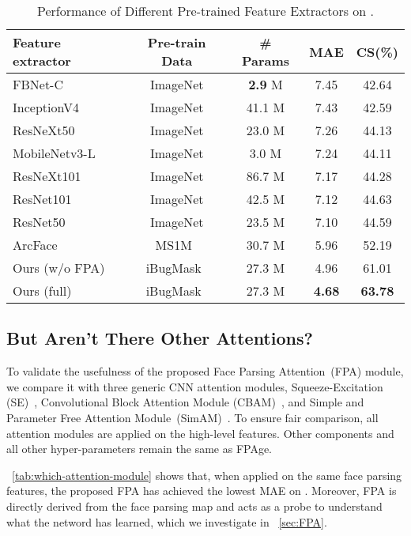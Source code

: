 \begin{table}[h]
    \caption{Performance of Different Pre-trained Feature Extractors on \imdbc.}
    \label{tab:which-feature-extractor}
    \centering
    \begin{tabular}{l|c|c|c|c}
    \toprule
        Feature extractor & Pre-train Data & \# Params & MAE  & CS(\%)  \\ \hline
        FBNet-C & ImageNet  & \textbf{2.9} M & 7.45 & 42.64 \\
        InceptionV4& ImageNet  & 41.1 M & 7.43 & 42.59 \\
        ResNeXt50& ImageNet & 23.0 M & 7.26 & 44.13 \\
        MobileNetv3-L& ImageNet  & 3.0 M & 7.24 & 44.11 \\
        ResNeXt101& ImageNet & 86.7 M & 7.17 & 44.28 \\ 
        ResNet101& ImageNet & 42.5 M & 7.12 & 44.63 \\
        ResNet50& ImageNet & 23.5 M & 7.10 & 44.59 \\
        ArcFace~\cite{deng2018arcface}& MS1M~\cite{guo2016ms1m} & 30.7 M & 5.96 & 52.19 \\ \hline
        Ours (w/o FPA) & iBugMask~\cite{linRoITanhpolarTransformer2021} & 27.3 M & 4.96 & 61.01 \\ 
        Ours (full) & iBugMask~\cite{linRoITanhpolarTransformer2021} & 27.3 M & \textbf{4.68} & \textbf{63.78} \\ 
    \bottomrule
    \end{tabular}
\end{table}






\subsection{But Aren't There Other Attentions?}
To validate the usefulness of the proposed Face Parsing Attention~(FPA) module, we compare it with three generic CNN attention modules, Squeeze-Excitation (SE)~\cite{Hu_2018_CVPR}, Convolutional Block Attention Module (CBAM)~\cite{Woo_2018_ECCV}, and Simple and Parameter Free Attention Module~(SimAM)~\cite{SimAM}. 
To ensure fair comparison, all attention modules are applied on the high-level features. Other components and all other hyper-parameters remain the same as FPAge.

\tableautorefname~\ref{tab:which-attention-module} shows that, when applied on the same face parsing features, the proposed FPA has achieved the lowest MAE on \imdbc. Moreover, FPA is directly derived from the face parsing map and acts as a probe to understand what the netword has learned, which we investigate in \sectionautorefname~\ref{sec:FPA}. 

